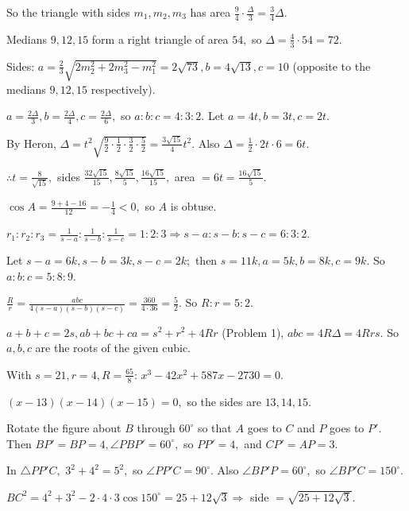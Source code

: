   So the triangle with sides $m_1, m_2, m_3$ has area $\frac{9}{4}\cdot\frac{\Delta}{3} = \frac{3}{4}\Delta.$

  Medians $9, 12, 15$ form a right triangle of area $54,$ so $\Delta = \frac{4}{3}\cdot 54 = 72.$

  Sides: $a = \frac{2}{3}\sqrt{2m_2^2 + 2m_3^2 - m_1^2} = 2\sqrt{73}, b = 4\sqrt{13}, c = 10$ (opposite to the medians $9, 12,
  15$ respectively).
\item $a = \frac{2\Delta}{3}, b = \frac{2\Delta}{4}, c = \frac{2\Delta}{6},$ so $a:b:c = 4:3:2.$ Let $a = 4t, b = 3t, c = 2t.$

  By Heron, $\Delta = t^2\sqrt{\frac{9}{2}\cdot\frac{1}{2}\cdot\frac{3}{2}\cdot\frac{5}{2}} = \frac{3\sqrt{15}}{4}t^2.$ Also
  $\Delta = \frac{1}{2}\cdot 2t\cdot 6 = 6t.$

  $\therefore t = \frac{8}{\sqrt{15}},$ sides $\frac{32\sqrt{15}}{15}, \frac{8\sqrt{15}}{5}, \frac{16\sqrt{15}}{15},$ area
  $= 6t = \frac{16\sqrt{15}}{5}.$

  $\cos A = \frac{9 + 4 - 16}{12} = -\frac{1}{4} < 0,$ so $A$ is obtuse.
\item $r_1:r_2:r_3 = \frac{1}{s - a}:\frac{1}{s - b}:\frac{1}{s - c} = 1:2:3 \Rightarrow s - a:s - b:s - c = 6:3:2.$

  Let $s - a = 6k, s - b = 3k, s - c = 2k;$ then $s = 11k, a = 5k, b = 8k, c = 9k.$ So $a:b:c = 5:8:9.$

  $\frac{R}{r} = \frac{abc}{4(s - a)(s - b)(s - c)} = \frac{360}{4\cdot 36} = \frac{5}{2}.$ So $R:r = 5:2.$
\item $a + b + c = 2s, ab + bc + ca = s^2 + r^2 + 4Rr$ (Problem 1), $abc = 4R\Delta = 4Rrs.$ So $a, b, c$ are the roots of the
  given cubic.

  With $s = 21, r = 4, R = \frac{65}{8}$: $x^3 - 42x^2 + 587x - 2730 = 0.$

  $(x - 13)(x - 14)(x - 15) = 0,$ so the sides are $13, 14, 15.$
\item Rotate the figure about $B$ through $60^\circ$ so that $A$ goes to $C$ and $P$ goes to $P'.$ Then $BP' = BP = 4,
  \angle PBP' = 60^\circ,$ so $PP' = 4,$ and $CP' = AP = 3.$

  In $\triangle PP'C,$ $3^2 + 4^2 = 5^2,$ so $\angle PP'C = 90^\circ.$ Also $\angle BP'P = 60^\circ,$ so $\angle BP'C =
  150^\circ.$

  $BC^2 = 4^2 + 3^2 - 2\cdot 4\cdot 3\cos 150^\circ = 25 + 12\sqrt{3}\Rightarrow$ side $= \sqrt{25 + 12\sqrt{3}}.$

